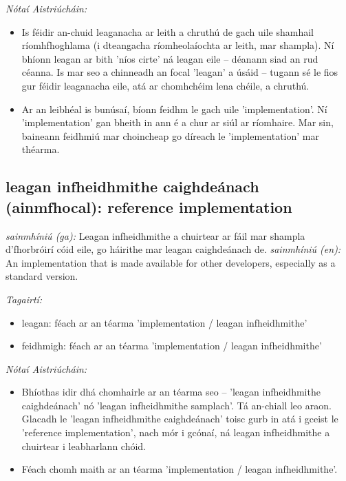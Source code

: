 \documentclass{article}
\begin{document}
 \noindent \textit{Nótaí Aistriúcháin:}
\begin{itemize}
	\item Is féidir an-chuid leaganacha ar leith a chruthú de gach uile shamhail ríomhfhoghlama (i dteangacha ríomheolaíochta ar leith, mar shampla). Ní bhíonn leagan ar bith 'níos cirte' ná leagan eile -- déanann siad an rud céanna. Is mar seo a chinneadh an focal 'leagan' a úsáid -- tugann sé le fios gur féidir leaganacha eile, atá ar chomhchéim lena chéile, a chruthú.
	\item Ar an leibhéal is bunúsaí, bíonn feidhm le gach uile 'implementation'. Ní 'implementation' gan bheith in ann é a chur ar siúl ar ríomhaire. Mar sin, baineann feidhmiú mar choincheap go díreach le 'implementation' mar théarma.
\end{itemize}


\subsection*{leagan infheidhmithe caighdeánach (ainmfhocal): reference implementation} 
 \noindent \textit{sainmhíniú (ga):} Leagan infheidhmithe a chuirtear ar fáil mar shampla d'fhorbróirí cóid eile, go háirithe mar leagan caighdeánach de.
\newline\newline
 \noindent \textit{sainmhíniú (en):} An implementation that is made available for other developers, especially as a standard version.
\newline

 \noindent \textit{Tagairtí:}
\begin{itemize}
	\item leagan: féach ar an téarma 'implementation / leagan infheidhmithe'
	\item feidhmigh: féach ar an téarma 'implementation / leagan infheidhmithe'
\end{itemize}

 \noindent \textit{Nótaí Aistriúcháin:}
\begin{itemize}
	\item Bhíothas idir dhá chomhairle ar an téarma seo -- 'leagan infheidhmithe caighdeánach' nó 'leagan infheidhmithe samplach'. Tá an-chiall leo araon. Glacadh le 'leagan infheidhmithe caighdeánach' toisc gurb in atá i gceist le 'reference implementation', nach mór i gcónaí, ná leagan infheidhmithe a chuirtear i leabharlann chóid.
	\item Féach chomh maith ar an téarma 'implementation / leagan infheidhmithe'.
\end{itemize}
\end{document}
